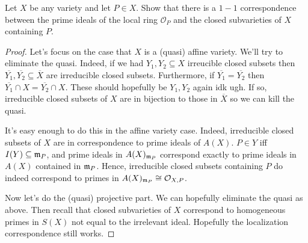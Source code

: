 \label{1.3.11}

Let $X$ be any variety and let $P \in X$. Show that there is a $1-1$ correspondence between the prime ideals of the local ring $\mathcal O_P$ and the closed subvarieties of $X$ containing $P$.

\begin{proof}
    Let's focus on the case that $X$ is a (quasi) affine variety. We'll try to eliminate the quasi. Indeed, if we had $Y_1, Y_2 \subseteq X$ irreucible closed subsets then $\overline{Y_1}, \overline{Y_2} \subseteq \overline{X}$ are irreducible closed subsets. Furthermore, if $\overline{Y_1} = \overline{Y_2}$ then $\overline{Y_1} \cap X = \overline{Y_2} \cap X$. These should hopefully be $Y_1, Y_2$ again idk ugh. If so, irreducible closed subsets of $X$ are in bijection to those in $\overline{X}$ so we can kill the quasi.

    It's easy enough to do this in the affine variety case. Indeed, irreducible closed subsets of $X$ are in correspondence to prime ideals of $A(X)$. $P \in Y$ iff $I(Y) \subseteq \mathfrak m_P$, and prime ideals in $A(X)_{\mathfrak m_P}$ correspond exactly to prime ideals in $A(X)$ contained in $\mathfrak m_P$. Hence, irreducible closed subsets containing $P$ do indeed correspond to primes in $A(X)_{\mathfrak m_P} \cong \mathcal O_{X, P}$.

    Now let's do the (quasi) projective part. We can hopefully eliminate the quasi as above. Then recall that closed subvarieties of $X$ correspond to homogeneous primes in $S(X)$ not equal to the irrelevant ideal. Hopefully the localization correspondence still works.
\end{proof}
